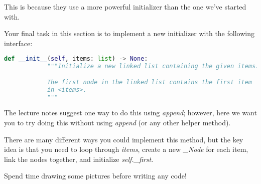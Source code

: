 \documentclass[12pt]{article}
\begin{document}
\begin{enumerate}[1.]
    This is because they use a more powerful initializer than the one we’ve started with.

    \bigskip

    Your final task in this section is to implement a new initializer with the following interface:

    \bigskip

    \begin{lstlisting}[language=python]
        def __init__(self, items: list) -> None:
            """Initialize a new linked list containing the given items.

            The first node in the linked list contains the first item
            in <items>.
            """
    \end{lstlisting}

    \bigskip

    The lecture notes suggest one way to do this using \textit{append}; however,
    here we want you to try doing this without using \textit{append} (or any other helper
    method).

    \bigskip

    There are many different ways you could implement this method, but the key idea
    is that you need to loop through \textit{items}, create a new \textit{\_Node} for each
    item, link the nodes together, and initialize \textit{self.\_first}.

    \bigskip

    Spend time drawing some pictures before writing any code!

\end{enumerate}
\end{document}
